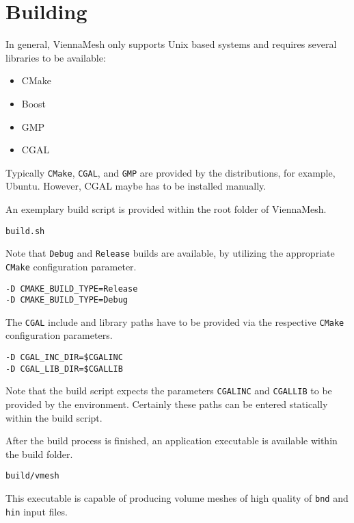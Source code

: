 \section{Building}

In general, ViennaMesh only supports Unix based systems and requires 
several libraries to be available:

\begin{itemize}
   \item CMake~\cite{cmake}
   \item Boost~\cite{boost}
   \item GMP~\cite{gmp}
   \item CGAL~\cite{cgal}
\end{itemize}

Typically \texttt{CMake}, \texttt{CGAL}, and \texttt{GMP} are provided by 
the distributions, for example, Ubuntu. However, CGAL maybe has to be installed manually.

An exemplary build script is provided within the root folder of ViennaMesh. 
\begin{exaipd}
\begin{Verbatim}
build.sh
\end{Verbatim}
\end{exaipd}

Note that \texttt{Debug} and \texttt{Release} builds are available, by utilizing 
the appropriate \texttt{CMake} configuration parameter.
\begin{exaipd}
\begin{Verbatim}
-D CMAKE_BUILD_TYPE=Release
-D CMAKE_BUILD_TYPE=Debug
\end{Verbatim}
\end{exaipd}

The \texttt{CGAL} include and library paths have to be provided via the 
respective \texttt{CMake} configuration parameters.
\begin{exaipd}
\begin{Verbatim}
-D CGAL_INC_DIR=$CGALINC
-D CGAL_LIB_DIR=$CGALLIB
\end{Verbatim}
\end{exaipd}

Note that the build script expects the parameters \texttt{CGALINC} and 
\texttt{CGALLIB} to be provided by the environment. 
Certainly these paths can be entered statically within the build script.

After the build process is finished, an application executable is available 
within the build folder. 
\begin{exaipd}
\begin{Verbatim}
build/vmesh
\end{Verbatim}
\end{exaipd}

This executable is capable of producing volume meshes of high quality of 
\texttt{bnd} and \texttt{hin} input files. 


